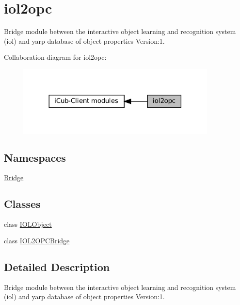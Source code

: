 \hypertarget{group__iol2opc}{}\section{iol2opc}
\label{group__iol2opc}


Bridge module between the interactive object learning and recognition system (iol) and yarp database of object properties Version\+:1.  


Collaboration diagram for iol2opc\+:
\nopagebreak
\begin{figure}[H]
\begin{center}
\leavevmode
\includegraphics[width=284pt]{group__iol2opc}
\end{center}
\end{figure}
\subsection*{Namespaces}
\begin{DoxyCompactItemize}
\item 
 \hyperlink{namespaceBridge}{Bridge}
\end{DoxyCompactItemize}
\subsection*{Classes}
\begin{DoxyCompactItemize}
\item 
class \hyperlink{group__iol2opc_classIOLObject}{I\+O\+L\+Object}
\item 
class \hyperlink{group__iol2opc_classIOL2OPCBridge}{I\+O\+L2\+O\+P\+C\+Bridge}
\end{DoxyCompactItemize}


\subsection{Detailed Description}
Bridge module between the interactive object learning and recognition system (iol) and yarp database of object properties Version\+:1. 


